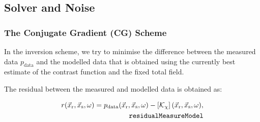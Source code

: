\documentclass[10pt,a4paper]{article}
\newcommand{\xs}{\vec{x}_\text{s}}
\newcommand{\xr}{\vec{x}_\text{r}}
\begin{document}


\subsection{Solver and Noise}
\label{CG_solver}
\subsubsection{The Conjugate Gradient (CG) Scheme}
\label{conjgrad}
In the inversion scheme, we try to minimise the difference between the
measured data $p_\text{data}$ and the modelled data that is obtained
using the currently best estimate of the contrast function and the
fixed total field.

The residual between the measured and modelled data is obtained as:

\begin{align} \label{eq:residualMeasureModel} r(\xr, \xs, \omega) =
p_{\text{data}}(\xr, \xs, \omega) - \left[\mathcal{K}_\chi
\right](\xr, \xs, \omega),\\
\tag*{\texttt{residualMeasureModel}}
\end{align}
\end{document}
